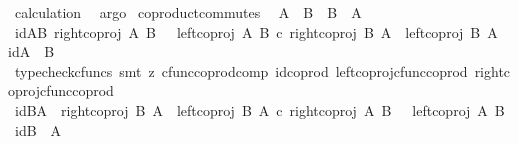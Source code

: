 \begin{isabellebody}
\ calculation\ \isamarkupfalse%
\ argo\isanewline
{}\isamarkupfalse%
%
\endisatagproof
{\isafoldproof}%
%
\isadelimproof
%
\endisadelimproof
%
\isadelimdocument
%
\endisadelimdocument
%
\isatagdocument
%
\isamarkuptrue%
%
\endisatagdocument
{\isafolddocument}%
%
\isadelimdocument
%
\endisadelimdocument
{}\isamarkupfalse%
\ coproduct{\isacharunderscore}{\kern0pt}commutes{\isacharcolon}{\kern0pt}\isanewline
\ \ {\isachardoublequoteopen}A\ {\isasymCoprod}\ B\ {\isasymcong}\ B\ {\isasymCoprod}\ A{\isachardoublequoteclose}\isanewline
%
\isadelimproof
%
\endisadelimproof
%
\isatagproof
{}\isamarkupfalse%
\ {\isacharminus}{\kern0pt}\isanewline
\ \ \isamarkupfalse%
\ id{\isacharunderscore}{\kern0pt}AB{\isacharcolon}{\kern0pt}\ {\isachardoublequoteopen}{\isacharparenleft}{\kern0pt}{\isacharparenleft}{\kern0pt}right{\isacharunderscore}{\kern0pt}coproj\ A\ B{\isacharparenright}{\kern0pt}\ \ {\isasymamalg}\ {\isacharparenleft}{\kern0pt}left{\isacharunderscore}{\kern0pt}coproj\ A\ B{\isacharparenright}{\kern0pt}{\isacharparenright}{\kern0pt}\ {\isasymcirc}\isactrlsub c\ {\isacharparenleft}{\kern0pt}{\isacharparenleft}{\kern0pt}right{\isacharunderscore}{\kern0pt}coproj\ B\ A{\isacharparenright}{\kern0pt}\ {\isasymamalg}\ {\isacharparenleft}{\kern0pt}left{\isacharunderscore}{\kern0pt}coproj\ B\ A{\isacharparenright}{\kern0pt}{\isacharparenright}{\kern0pt}\ {\isacharequal}{\kern0pt}\ id{\isacharparenleft}{\kern0pt}A\ {\isasymCoprod}\ B{\isacharparenright}{\kern0pt}{\isachardoublequoteclose}\isanewline
\ \ \ \ \isamarkupfalse%
\ {\isacharparenleft}{\kern0pt}typecheck{\isacharunderscore}{\kern0pt}cfuncs{\isacharcomma}{\kern0pt}\ smt\ {\isacharparenleft}{\kern0pt}z{}{\isacharparenright}{\kern0pt}\ cfunc{\isacharunderscore}{\kern0pt}coprod{\isacharunderscore}{\kern0pt}comp\ id{\isacharunderscore}{\kern0pt}coprod\ left{\isacharunderscore}{\kern0pt}coproj{\isacharunderscore}{\kern0pt}cfunc{\isacharunderscore}{\kern0pt}coprod\ right{\isacharunderscore}{\kern0pt}coproj{\isacharunderscore}{\kern0pt}cfunc{\isacharunderscore}{\kern0pt}coprod{\isacharparenright}{\kern0pt}\isanewline
\ \ \isamarkupfalse%
\ id{\isacharunderscore}{\kern0pt}BA{\isacharcolon}{\kern0pt}\ {\isachardoublequoteopen}\ {\isacharparenleft}{\kern0pt}{\isacharparenleft}{\kern0pt}right{\isacharunderscore}{\kern0pt}coproj\ B\ A{\isacharparenright}{\kern0pt}\ {\isasymamalg}\ {\isacharparenleft}{\kern0pt}left{\isacharunderscore}{\kern0pt}coproj\ B\ A{\isacharparenright}{\kern0pt}{\isacharparenright}{\kern0pt}\ {\isasymcirc}\isactrlsub c\ {\isacharparenleft}{\kern0pt}{\isacharparenleft}{\kern0pt}right{\isacharunderscore}{\kern0pt}coproj\ A\ B{\isacharparenright}{\kern0pt}\ \ {\isasymamalg}\ {\isacharparenleft}{\kern0pt}left{\isacharunderscore}{\kern0pt}coproj\ A\ B{\isacharparenright}{\kern0pt}{\isacharparenright}{\kern0pt}\ {\isacharequal}{\kern0pt}\ id{\isacharparenleft}{\kern0pt}B\ {\isasymCoprod}\ A{\isacharparenright}{\kern0pt}{\isachardoublequoteclose}\isanewline

\end{isabellebody}
